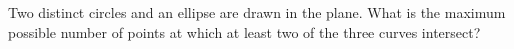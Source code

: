 Two distinct circles and an ellipse are drawn in the plane. What is the maximum possible number of points at which at least two of the three curves intersect?

